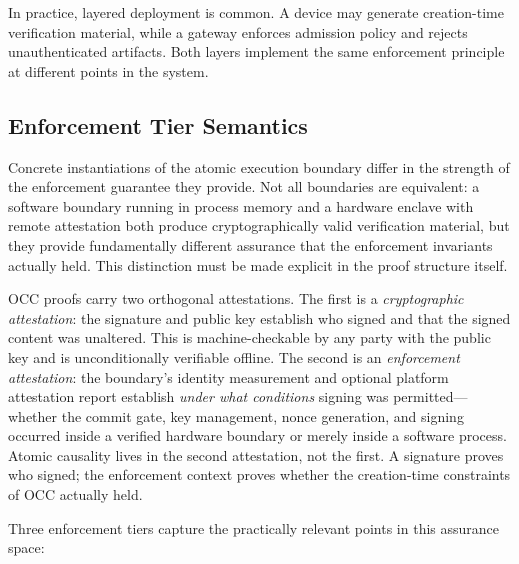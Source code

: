 \documentclass[11pt,letterpaper]{article}
\theoremstyle{occplain}
\theoremstyle{occremark}
\begin{document}
In practice, layered deployment is common. A device may generate creation-time verification material, while a gateway enforces admission policy and rejects unauthenticated artifacts. Both layers implement the same enforcement principle at different points in the system.


\subsection{Enforcement Tier Semantics}
\label{sec:enforcement-tiers}

Concrete instantiations of the atomic execution boundary differ in the strength of the enforcement guarantee they provide. Not all boundaries are equivalent: a software boundary running in process memory and a hardware enclave with remote attestation both produce cryptographically valid verification material, but they provide fundamentally different assurance that the enforcement invariants actually held. This distinction must be made explicit in the proof structure itself.

OCC proofs carry two orthogonal attestations. The first is a \emph{cryptographic attestation}: the signature and public key establish who signed and that the signed content was unaltered. This is machine-checkable by any party with the public key and is unconditionally verifiable offline. The second is an \emph{enforcement attestation}: the boundary's identity measurement and optional platform attestation report establish \emph{under what conditions} signing was permitted---whether the commit gate, key management, nonce generation, and signing occurred inside a verified hardware boundary or merely inside a software process. Atomic causality lives in the second attestation, not the first. A signature proves who signed; the enforcement context proves whether the creation-time constraints of OCC actually held.

Three enforcement tiers capture the practically relevant points in this assurance space:
\end{document}
